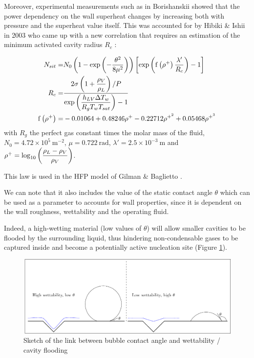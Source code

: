 \npar

Moreover, experimental measurements such as in Borishanskii \cite{borishanskii_heat_1969} showed that the power dependency on the wall superheat changes by increasing both with pressure and the superheat value itself. This was accounted for by Hibiki \& Ishii in 2003 \cite{hibiki_active_2003} who came up with a new correlation that requires an estimation of the minimum activated cavity radius $R_{c}$ : 


\begin{align}
N_{sit} =& N_{0}\parth{1-\exp{-\dfrac{\theta^{2}}{8\mu^{2}} } }\crocht{\exp{ \mathrm{f}\parth{\rho^{+}}\dfrac{\lambda '}{R_{c}} } -1}
\label{eq:nsit_hibiki} \\
%
R_{c} =& \dfrac{2\sigma\parth{1+\dfrac{\rho_{V}}{\rho_{L}}} / P }{\exp{\dfrac{h_{LV} \Delta T_{w}}{R_{g}T_{w}T_{sat}} } -1}\\
%
\mathrm{f}\parth{\rho^{+}} =& -0.01064 + 0.48246\rho^{+} - 0.22712 \rho^{+^{2}} + 0.05468 \rho^{+^{3}}
\end{align}
with $R_{g}$ the perfect gas constant times the molar mass of the fluid,  $N_{0}=4.72\times 10^{5}\ \mathrm{m}^{-2}$, $\mu = 0.722\ \mathrm{rad}$, $\lambda ' = 2.5 \times 10^{-3} \ \mathrm{m}$ and $\rho^{+}=\mathrm{log}_{10}\left( \dfrac{\rho_{L}-\rho_{V}}{\rho_{V}} \right)$.


\begin{remark*}{}
This law is used in the HFP model of Gilman \& Baglietto \cite{gilman_self-consistent_2017}.
\end{remark*}

We can note that it also includes the value of the static contact angle $\theta$ which can be used as a parameter to accounts for wall properties, since it is dependent on the wall roughness, wettability and the operating fluid. 

Indeed, a high-wetting material (low values of $\theta$) will allow smaller cavities to be flooded by the surrounding liquid, thus hindering non-condensable gases to be captured inside and become a potentially active nucleation site (Figure \ref{fig:nsd_theta_wet}).

\begin{figure}[h!]
\centering
\includegraphics[scale=0.8]{img/NSD/wettability.pdf}
\caption{Sketch of the link between bubble contact angle and wettability / cavity flooding}
\label{fig:nsd_theta_wet}
\end{figure}

